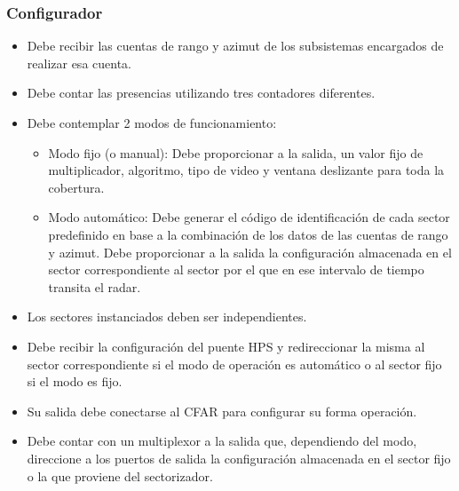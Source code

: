 \subsubsection{Configurador}
\begin{itemize}
\item Debe recibir las cuentas de rango y azimut de los subsistemas encargados de realizar esa cuenta.
\item Debe contar las presencias utilizando tres contadores diferentes.
\item Debe contemplar 2 modos de funcionamiento:
	\begin{itemize}
	\item Modo fijo (o manual): Debe proporcionar a la salida, un valor fijo de multiplicador, algoritmo, tipo de video y ventana deslizante para toda la cobertura.
	\item Modo automático: Debe generar el código de identificación de cada sector predefinido en base a la combinación de los datos de las cuentas de rango y azimut. Debe proporcionar a la salida la configuración almacenada en el sector correspondiente al sector por el que en ese intervalo de tiempo transita el radar.
	\end{itemize}
	
\item Los sectores instanciados deben ser independientes.
\item Debe recibir la configuración del puente HPS y redireccionar la misma al sector correspondiente si el modo de operación es automático o al sector fijo si el modo es fijo.
\item Su salida debe conectarse al CFAR para configurar su forma operación.
\item Debe contar con un multiplexor a la salida que, dependiendo del modo, direccione a los puertos de salida la configuración almacenada en el sector fijo o la que proviene del sectorizador.
\end{itemize}








	